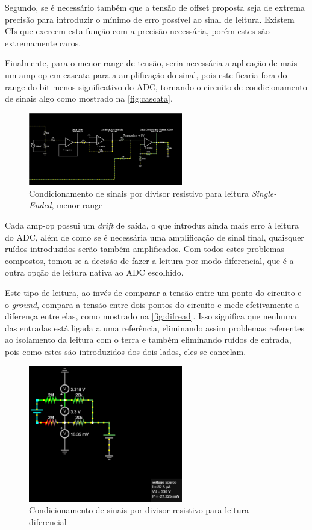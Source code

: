 Segundo, se é necessário também que a tensão de offset proposta seja de extrema precisão para introduzir o mínimo de erro possível ao sinal de leitura. Existem \gls{CI}s que exercem esta função com a precisão necessária, porém estes são extremamente caros.

Finalmente, para o menor range de tensão, seria necessária a aplicação de mais um \gls{amp-op} em cascata para a amplificação do sinal, pois este ficaria fora do range do bit menos significativo do \gls{ADC}, tornando o circuito de condicionamento de sinais algo como mostrado na \autoref{fig:cascata}.

\begin{figure}[htb!]
    \caption{Condicionamento de sinais por divisor resistivo para leitura \textit{Single-Ended}, menor range}
    \label{fig:cascata}
    \includegraphics[width=0.6\textwidth]{figuras/cascata.png}
    \fonte{}
\end{figure}

Cada \gls{amp-op} possui um \textit{drift} de saída, o que introduz ainda mais erro à leitura do \gls{ADC}, além de como se é necessária uma amplificação de sinal final, quaisquer ruídos introduzidos serão também amplificados. Com todos estes problemas compostos, tomou-se a decisão de fazer a leitura por modo diferencial, que é a outra opção de leitura nativa ao \gls{ADC} escolhido.

Este tipo de leitura, ao invés de comparar a tensão entre um ponto do circuito e o \textit{ground}, compara a tensão entre dois pontos do circuito e mede efetivamente a diferença entre elas, como mostrado na \autoref{fig:difread}. Isso significa que nenhuma das entradas está ligada a uma referência, eliminando assim problemas referentes ao isolamento da leitura com o terra e também eliminando ruídos de entrada, pois como estes são introduzidos dos dois lados, eles se cancelam.

\begin{figure}[htb!]
    \caption{Condicionamento de sinais por divisor resistivo para leitura diferencial}
    \label{fig:difread}
    \includegraphics[width=0.6\textwidth]{figuras/difread.png}
    \fonte{}
\end{figure}

